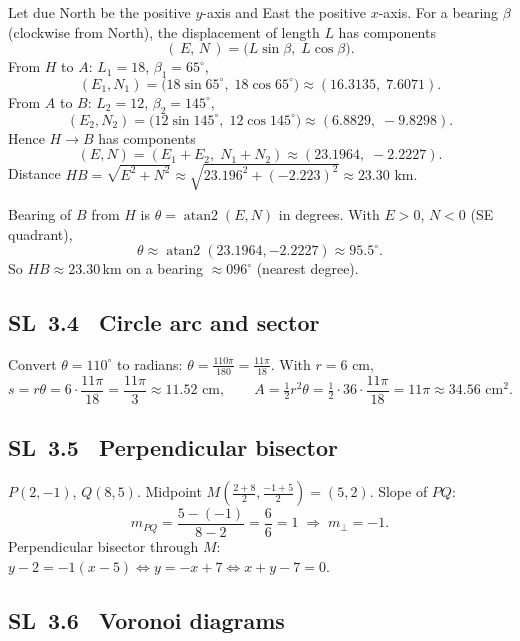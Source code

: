 \documentclass[11pt]{article}
\newcommand{\tocsubsection}[1]{\subsection{#1}}
\begin{document}
\begin{solution}
Let due North be the positive $y$-axis and East the positive $x$-axis. For a bearing $\beta$ (clockwise from North), the displacement of length $L$ has components
\[
(\,E,\,N\,)=\big(L\sin\beta,\;L\cos\beta\big).
\]
From $H$ to $A$: $L_1=18$, $\beta_1=65^\circ$,
\[
(E_1,N_1)=\big(18\sin65^\circ,\;18\cos65^\circ\big)\approx(16.3135,\;7.6071).
\]
From $A$ to $B$: $L_2=12$, $\beta_2=145^\circ$,
\[
(E_2,N_2)=\big(12\sin145^\circ,\;12\cos145^\circ\big)\approx(6.8829,\;-9.8298).
\]
Hence $H\to B$ has components
\[
(E,N)=(E_1+E_2,\;N_1+N_2)\approx(23.1964,\;-2.2227).
\]
Distance $HB=\sqrt{E^2+N^2}\approx \sqrt{23.196^2+(-2.223)^2}\approx 23.30\text{ km}.$

Bearing of $B$ from $H$ is $\theta=\operatorname{atan2}(E,N)$ in degrees. With $E>0$, $N<0$ (SE quadrant),
\[
\theta\approx \operatorname{atan2}(23.1964,-2.2227)\approx 95.5^\circ.
\]
So $HB\approx 23.30\,$km on a bearing $\approx 096^\circ$ (nearest degree).
\end{solution}


\tocsubsection{SL 3.4 \; Circle arc and sector}


\begin{solution}
Convert $\theta=110^\circ$ to radians: $\theta=\frac{110\pi}{180}=\frac{11\pi}{18}$. With $r=6$ cm,
\[
s=r\theta=6\cdot\frac{11\pi}{18}=\frac{11\pi}{3}\approx 11.52\text{ cm},\qquad
A=\tfrac12 r^2\theta=\tfrac12\cdot36\cdot\frac{11\pi}{18}=11\pi\approx 34.56\text{ cm}^2.
\]
\end{solution}

\tocsubsection{SL 3.5 \; Perpendicular bisector}

\begin{solution}
$P(2,-1)$, $Q(8,5)$. Midpoint $M\!\left(\tfrac{2+8}{2},\tfrac{-1+5}{2}\right)=(5,2)$. Slope of $PQ$:
\[
m_{PQ}=\frac{5-(-1)}{8-2}=\frac{6}{6}=1\;\Rightarrow\; m_\perp=-1.
\]
Perpendicular bisector through $M$: $y-2=-1(x-5)\iff y=-x+7\iff x+y-7=0$.
\end{solution}

\tocsubsection{SL 3.6 \; Voronoi diagrams}
\end{document}
